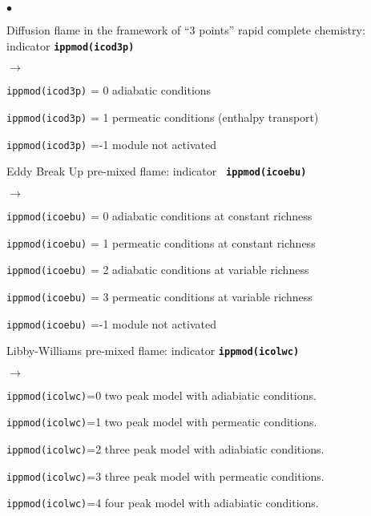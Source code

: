 {{{\begin{list}{$\bullet$}{}
       \item Diffusion flame in the framework of ``3 points'' rapid complete
             chemistry: indicator {\bf \tt ippmod(icod3p)}
        \begin{list}{$\rightarrow$}{}
               \item \texttt{ippmod(icod3p)} = 0 adiabatic conditions
               \item \texttt{ippmod(icod3p)} = 1 permeatic conditions (enthalpy
                     transport)
               \item \texttt{ippmod(icod3p)} =-1 module not activated
         \end{list}
        \item Eddy Break Up pre-mixed flame: indicator {\bf \tt
             ippmod(icoebu)}
         \begin{list}{$\rightarrow$}{}
                \item \texttt{ippmod(icoebu)} = 0 adiabatic
                      conditions at constant richness
                \item \texttt{ippmod(icoebu)} = 1 permeatic conditions at
                      constant richness
                \item \texttt{ippmod(icoebu)} = 2 adiabatic conditions at
                      variable richness
                \item \texttt{ippmod(icoebu)} = 3 permeatic conditions at
                      variable richness
                \item \texttt{ippmod(icoebu)} =-1 module not activated
         \end{list}
        \item Libby-Williams pre-mixed flame: indicator {\bf \tt ippmod(icolwc)}
         \begin{list}{$\rightarrow$}{}
               \item \texttt{ippmod(icolwc)}=0 two peak model with adiabiatic conditions.
               \item \texttt{ippmod(icolwc)}=1 two peak model with permeatic conditions.
               \item \texttt{ippmod(icolwc)}=2 three peak model with adiabiatic conditions.
               \item \texttt{ippmod(icolwc)}=3 three peak model with permeatic conditions.
               \item \texttt{ippmod(icolwc)}=4 four peak model with adiabiatic conditions.

\end{list}
\end{list}}}}
